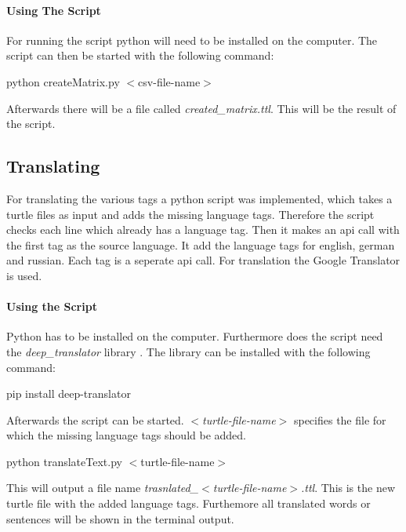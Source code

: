 \paragraph{Using The Script}

For running the script python will need to be installed on the computer.
The script can then be started with the following command:

\begin{center}
    python createMatrix.py $<$csv-file-name$>$
\end{center}

Afterwards there will be a file called \textit{created\_matrix.ttl}.
This will be the result of the script.


\subsection{Translating}

For translating the various tags a python script was implemented, which takes a turtle files as input and adds the missing language tags.
Therefore the script checks each line which already has a language tag. 
Then it makes an api call with the first tag as the source language.
It add the language tags for english, german and russian. 
Each tag is a seperate api call.
For translation the Google Translator is used.

\paragraph{Using the Script}

Python has to be installed on the computer.
Furthermore does the script need the \textit{deep\_translator} library \cite{deep_translator}. 
The library can be installed with the following command:

\begin{center}
    pip install deep-translator
\end{center}

Afterwards the script can be started. 
\textit{$<$turtle-file-name$>$} specifies the file for which the missing language tags should be added.

\begin{center}
    python translateText.py $<$turtle-file-name$>$
\end{center}

This will output a file name \textit{trasnlated\_$<$turtle-file-name$>$.ttl}.
This is the new turtle file with the added language tags.
Furthemore all translated words or sentences will be shown in the terminal output.
